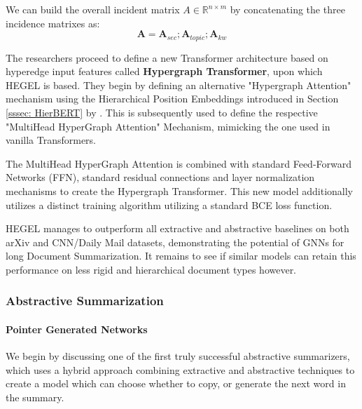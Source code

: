 \documentclass[preprint,review,12pt]{elsarticle}
\begin{document}
We can build the overall incident matrix $A \in \mathbb{R}^{n\times m}$ by concatenating the three incidence matrixes as:
\begin{equation}
    \mathbf{A} = \mathbf{A}_{sec};\mathbf{A}_{topic};\mathbf{A}_{kw}
\end{equation}

The researchers proceed to define a new Transformer architecture based on hyperedge input features called \textbf{Hypergraph Transformer}, upon which HEGEL is based. They begin by defining an alternative "Hypergraph Attention" mechanism using the Hierarchical Position Embeddings introduced in Section \ref{sssec: HierBERT} by \citet{histruct}. This is subsequently used to define the respective "MultiHead HyperGraph Attention" Mechanism, mimicking the one used in vanilla Transformers.  

The MultiHead HyperGraph Attention is combined with standard Feed-Forward Networks (FFN), standard residual connections and layer normalization mechanisms to create the Hypergraph Transformer. This new model additionally utilizes a distinct training algorithm utilizing a standard BCE loss function. 


HEGEL manages to outperform all extractive and abstractive baselines on both arXiv and CNN/Daily Mail datasets, demonstrating the potential of GNNs for long Document Summarization. It remains to see if similar models can retain this performance on less rigid and hierarchical document types however.


\subsubsection{Abstractive Summarization}

\paragraph{Pointer Generated Networks} We begin by discussing one of the first truly successful abstractive summarizers, which uses a hybrid approach combining extractive and abstractive techniques to create a model which can choose whether to copy, or generate the next word in the summary. 

\end{document}
